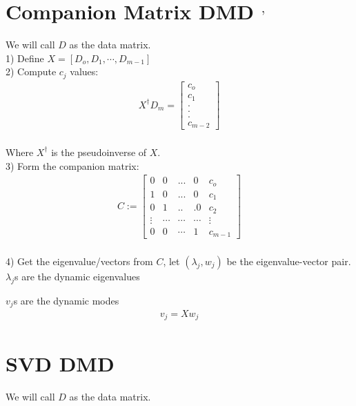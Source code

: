\documentclass{article}
\begin{document}
\newpage
\section{Companion Matrix DMD \autocite[8]{YoshiComp}$^{,}$ \autocite[9]{rowley2009spectral}}
We will call $D$ as the data matrix.\\

1) Define $X=[D_o,D_1, \cdots ,D_{m-1}]$\\

2) Compute $c_j$ values:\\
\begin{align*}
X^\dagger D_m = \begin{bmatrix}
c_o \\
c_1 \\
.\\
.\\
.\\
c_{m-2}
\end{bmatrix}
\end{align*}\\
Where $X^\dagger$ is the pseudoinverse of $X$.\\

3) Form the companion matrix:
\begin{align*}
C:= \begin{bmatrix}
0 & 0 &...& 0 &c_o \\
1 &0& ...&  0& c_1 \\
0 &1& ..&. 0& c_2 \\
\vdots& \cdots& \cdots& \cdots & \vdots \\
0 &0& \cdots& 1& c_{m-1}
\end{bmatrix}
\end{align*}\\

4) Get the eigenvalue/vectors from $C$, let $(\lambda_j,w_j)$ be the eigenvalue-vector pair.\\

$\lambda_j$s are the dynamic eigenvalues\

$v_j$s are the dynamic modes\\
\begin{align*}
v_j=Xw_j
\end{align*}

\section{SVD DMD\autocite[10]{tu2013dynamic}}
We will call $D$ as the data matrix.\\
\end{document}
